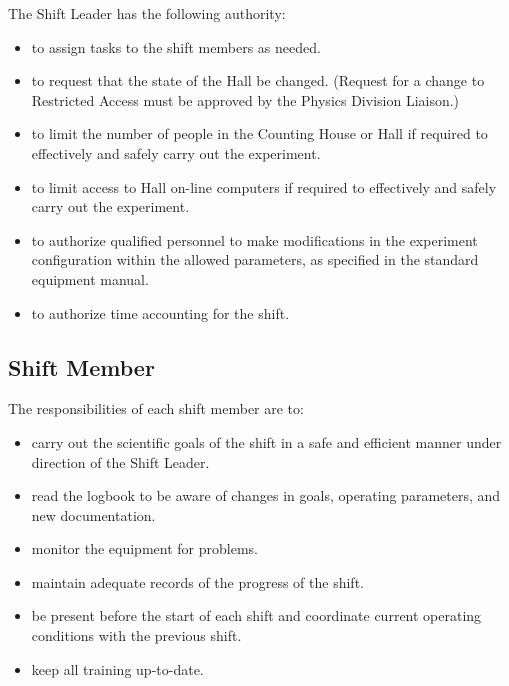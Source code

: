 \documentclass[11pt]{article}
\begin{document}
The Shift Leader has the following authority: 

\begin{itemize}

\item to assign tasks to the shift members as needed.

\item to request that the state of the Hall be changed. (Request for a
change to Restricted Access must be approved by the Physics Division
Liaison.)

\item to limit the number of people in the Counting House or Hall 
if required to effectively and safely carry out the experiment.

\item to limit access to Hall on-line computers if required to
effectively and safely carry out the experiment.

\item to authorize qualified personnel to make modifications in the experiment
configuration within the allowed parameters, as specified in the standard equipment
manual.

\item to authorize time accounting for the shift.

\end{itemize}

\subsection{Shift Member}
\indent

The responsibilities of each shift member are to:
\begin{itemize}

\item carry out the scientific goals of the shift in a safe and efficient
 manner under direction of the Shift Leader.

\item read the logbook to be aware of changes in goals, operating
parameters, and new documentation.

\item monitor the equipment for problems.

\item maintain adequate records of the progress of the shift.

\item be present before the start of each shift and 
coordinate current operating conditions with the previous shift.

\item keep all training up-to-date.

\end{itemize}
\end{document}
